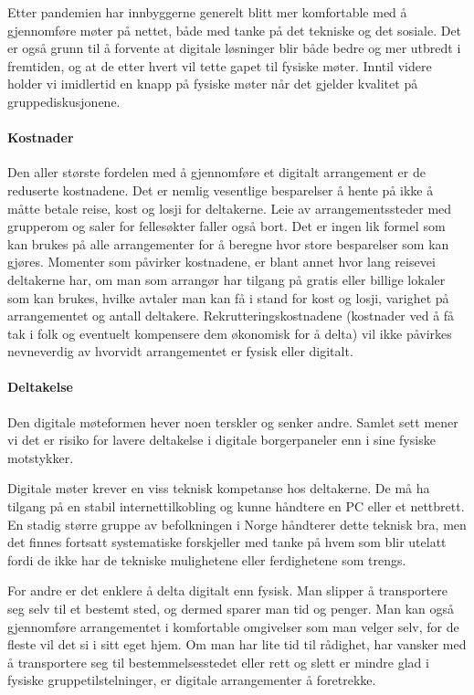 \documentclass[
  12pt,
  a4paper, 12pt]{article}
\begin{document}
Etter pandemien har innbyggerne generelt blitt mer komfortable med å gjennomføre møter på nettet, både med tanke på det tekniske og det sosiale. Det er også grunn til å forvente at digitale løsninger blir både bedre og mer utbredt i fremtiden, og at de etter hvert vil tette gapet til fysiske møter. Inntil videre holder vi imidlertid en knapp på fysiske møter når det gjelder kvalitet på gruppediskusjonene.

\hypertarget{kostnader}{%
\paragraph{Kostnader}\label{kostnader}}

Den aller største fordelen med å gjennomføre et digitalt arrangement er de reduserte kostnadene. Det er nemlig vesentlige besparelser å hente på ikke å måtte betale reise, kost og losji for deltakerne. Leie av arrangementssteder med grupperom og saler for fellesøkter faller også bort. Det er ingen lik formel som kan brukes på alle arrangementer for å beregne hvor store besparelser som kan gjøres. Momenter som påvirker kostnadene, er blant annet hvor lang reisevei deltakerne har, om man som arrangør har tilgang på gratis eller billige lokaler som kan brukes, hvilke avtaler man kan få i stand for kost og losji, varighet på arrangementet og antall deltakere. Rekrutteringskostnadene (kostnader ved å få tak i folk og eventuelt kompensere dem økonomisk for å delta) vil ikke påvirkes nevneverdig av hvorvidt arrangementet er fysisk eller digitalt.

\hypertarget{deltakelse}{%
\paragraph{Deltakelse}\label{deltakelse}}

Den digitale møteformen hever noen terskler og senker andre. Samlet sett mener vi det er risiko for lavere deltakelse i digitale borgerpaneler enn i sine fysiske motstykker.

Digitale møter krever en viss teknisk kompetanse hos deltakerne. De må ha tilgang på en stabil internettilkobling og kunne håndtere en PC eller et nettbrett. En stadig større gruppe av befolkningen i Norge håndterer dette teknisk bra, men det finnes fortsatt systematiske forskjeller med tanke på hvem som blir utelatt fordi de ikke har de tekniske mulighetene eller ferdighetene som trengs.

For andre er det enklere å delta digitalt enn fysisk. Man slipper å transportere seg selv til et bestemt sted, og dermed sparer man tid og penger. Man kan også gjennomføre arrangementet i komfortable omgivelser som man velger selv, for de fleste vil det si i sitt eget hjem. Om man har lite tid til rådighet, har vansker med å transportere seg til bestemmelsesstedet eller rett og slett er mindre glad i fysiske gruppetilstelninger, er digitale arrangementer å foretrekke.
\end{document}
